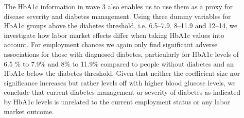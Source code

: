 \documentclass[12pt,english,british]{article}
\begin{document}
The \ac{HbA1c} information in wave 3 also enables us to use them as a proxy for disease
severity and diabetes management. Using three dummy variables for \ac{HbA1c} groups above the
diabetes threshold, i.e. 6.5--7.9, 8--11.9 and 12--14, we investigate
how labor market effects differ when taking \ac{HbA1c} values
into account. For employment chances
we again only find significant adverse associations for
those with diagnosed diabetes, particularly for \ac{HbA1c} levels of 6.5 \% to 7.9\%
and 8\% to 11.9\% compared to people without diabetes and an \ac{HbA1c} below the
diabetes threshold. Given that neither the coefficient size nor significance increases but rather levels off with higher blood glucose levels, we conclude that current diabetes management or severity of diabetes as indicated by \ac{HbA1c} levels is unrelated to the current employment status or any labor market outcome.
\end{document}
